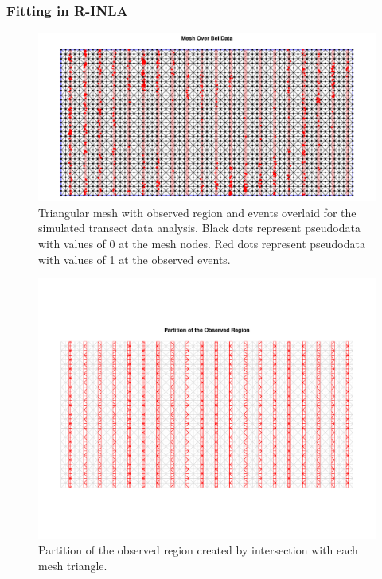 \documentclass[]{interact}
\begin{document}
\subsubsection{Fitting in R-INLA}
\label{xsectfitting}

\begin{figure}[p]
\includegraphics[width=\textwidth]{figures/bei-effort_mesh.pdf}
\caption{Triangular mesh with observed region and events overlaid for the
simulated transect data analysis. Black dots represent pseudodata with values
of 0 at the mesh nodes. Red dots represent pseudodata with values of 1 at the
observed events.}
\label{effortmesh}
\end{figure}

\begin{figure}[p]
\includegraphics[width=\textwidth]{figures/bei-effort_partition.pdf}
\caption{Partition of the observed region created by intersection with each
mesh triangle.}
\label{effortpartition}
\end{figure}
\end{document}

